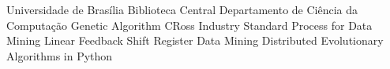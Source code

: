 			{Universidade de Brasília}
			{Biblioteca Central}
			{Departamento de Ciência da Computação}
			{Genetic Algorithm}
	{CRoss Industry Standard Process for Data Mining}
		{Linear Feedback Shift Register}
			{Data Mining}
		{Distributed Evolutionary Algorithms in Python}